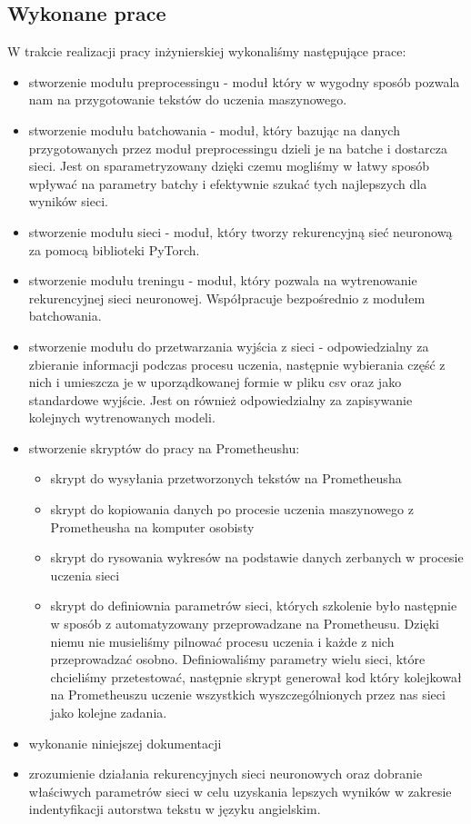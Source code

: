 \subsection{Wykonane prace}
W trakcie realizacji pracy inżynierskiej wykonaliśmy następujące prace:
\begin{itemize}
  \item stworzenie modułu preprocessingu - moduł który w wygodny sposób pozwala nam na przygotowanie tekstów 
  do uczenia maszynowego. 
  \item stworzenie modułu batchowania - moduł, który bazując na danych przygotowanych przez moduł 
  preprocessingu dzieli je na batche i dostarcza sieci. Jest on sparametryzowany dzięki czemu mogliśmy
  w łatwy sposób wpływać na parametry batchy i efektywnie szukać tych najlepszych dla wyników sieci. 
  \item stworzenie modułu sieci - moduł, który tworzy rekurencyjną sieć neuronową za pomocą
  biblioteki PyTorch.
  \item stworzenie modułu treningu - moduł, który pozwala na wytrenowanie rekurencyjnej sieci neuronowej. 
  Współpracuje bezpośrednio z modułem batchowania.
  \item stworzenie modułu do przetwarzania wyjścia z sieci - odpowiedzialny za zbieranie informacji podczas procesu uczenia,
  następnie wybierania część z nich i umieszcza je w uporządkowanej formie w pliku csv oraz 
  jako standardowe wyjście. Jest on również odpowiedzialny za zapisywanie kolejnych wytrenowanych modeli. 
  \item stworzenie skryptów do pracy na Prometheushu:
  \begin{itemize}
    \item skrypt do wysyłania przetworzonych tekstów na Prometheusha 
    \item skrypt do kopiowania danych po procesie uczenia maszynowego z Prometheusha na komputer osobisty
    \item skrypt do rysowania wykresów na podstawie danych zerbanych w procesie uczenia sieci
    \item skrypt do definiownia parametrów sieci, których szkolenie było następnie w sposób z
    automatyzowany przeprowadzane na Prometheusu. Dzięki niemu nie musieliśmy pilnować procesu uczenia i 
   	każde z nich przeprowadzać osobno. Definiowaliśmy parametry wielu sieci, które chcieliśmy przetestować,
   	następnie skrypt generował kod który kolejkował na Prometheuszu uczenie wszystkich wyszczególnionych przez nas sieci 
   	jako kolejne zadania.
  \end{itemize}
  \item wykonanie niniejszej dokumentacji
  \item zrozumienie działania rekurencyjnych sieci neuronowych oraz dobranie właściwych parametrów sieci 
  w celu uzyskania lepszych wyników w zakresie indentyfikacji autorstwa tekstu w języku angielskim.
\end{itemize}


